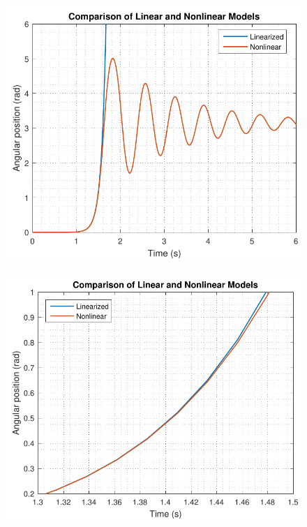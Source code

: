 \begin{minipage}{\linewidth}
  \begin{minipage}{0.5\linewidth}
    \begin{figure}[H]
    	\includegraphics[scale=.55]{figures/LinearizedVSNonlinear}
    	\centering
  		\captionsetup{justification=centering}
  		\label{LinearizedVSNonlinear}
  	\end{figure}
  \end{minipage}
  \begin{minipage}{0.5\linewidth}
  	\begin{figure}[H]%
  		\includegraphics[scale=.55]{figures/LinearizedVSNonlinearZoom}
  		\centering
  		\captionsetup{justification=centering}
  		\label{LinearizedVSNonlinearZoom}
  	\end{figure}
  \end{minipage}
\end{minipage}

